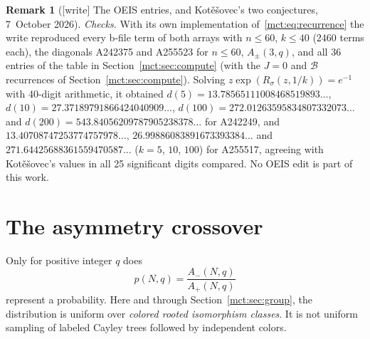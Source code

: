 \documentclass[11pt]{article}
\theoremstyle{definition}
\newtheorem{remark}[theorem]{Remark}
\newcommand{\classB}{\mathcal B}
\begin{document}
\begin{remark}[{[write]} The OEIS entries, and Kot\v{e}\v{s}ovec's two conjectures, 7~October 2026]
\emph{Checks.} With its own implementation of~\eqref{mct:eq:recurrence} the write reproduced every b-file term of both arrays with $n\le60$, $k\le40$ ($2460$ terms each), the diagonals A242375 and A255523 for $n\le60$, $A_\pm(3,q)$, and all 36 entries of the table in Section~\ref{mct:sec:compute} (with the $J=0$ and $\classB$ recurrences of Section~\ref{mct:sec:compute}). Solving $z\exp(R_\sigma(z,1/k))=e^{-1}$ with 40-digit arithmetic, it obtained $d(5)=13.78565111008468519893\ldots$, $d(10)=27.37189791866424040909\ldots$, $d(100)=272.01263595834807332073\ldots$ and $d(200)=543.84056209787905238378\ldots$ for A242249, and $13.40708747253774757978\ldots$, $26.99886083891673393384\ldots$ and $271.64425688361559470587\ldots$ ($k=5$, $10$, $100$) for A255517, agreeing with Kot\v{e}\v{s}ovec's values in all 25 significant digits compared. No OEIS edit is part of this work.
\end{remark}

\section{The asymmetry crossover}\label{mct:sec:crossover}
Only for positive integer $q$ does
\[
 p(N,q)=\frac{A_-(N,q)}{A_+(N,q)}
\]
represent a probability. Here and through Section~\ref{mct:sec:group}, the distribution is uniform over \emph{colored rooted isomorphism classes}. It is not uniform sampling of labeled Cayley trees followed by independent colors.
\end{document}
